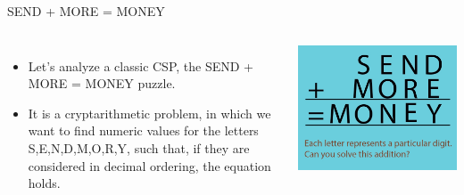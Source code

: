 \documentclass{beamer}
\begin{document}
\begin{frame}{SEND + MORE = MONEY}
\begin{columns}
        	\begin{itemize}
			\item Let's analyze a classic CSP, the SEND + MORE = MONEY puzzle.\\
			\item It is a cryptarithmetic problem, in which we want to find numeric values for the letters S,E,N,D,M,O,R,Y, such that, if they are considered in decimal ordering, the equation holds.
			\end{itemize}

			\includegraphics[scale=0.2]{img/money.jpg}
	\end{columns}
\end{frame}
\end{document}
